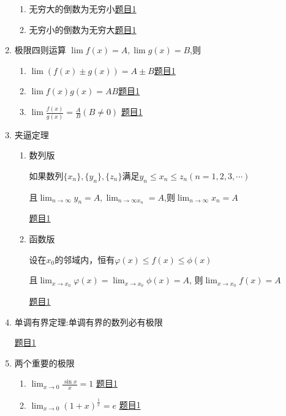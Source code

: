 \documentclass[12pt]{article} %
\begin{document}
\begin{enumerate}
\begin{enumerate}
        \item 无穷大的倒数为无穷小\quad \href{https://www.matongxue.com/matex/2596/react/}{题目1}
        \item 无穷小的倒数为无穷大\quad \href{https://www.matongxue.com/matex/2597/react/}{题目1}
    \end{enumerate}
\item 极限四则运算
    $\lim f(x)=A,\lim g(x)=B$,则
    \begin{enumerate}
        \item $\lim (f(x) \pm g(x))=A \pm B$\quad \href{https://www.matongxue.com/matex/2598/react/}{题目1}
        \item $\lim f(x)g(x)=AB$\quad \href{https://www.matongxue.com/matex/2599/react/}{题目1}
        \item $\displaystyle\lim \frac{f(x)}{g(x)}=\frac{A}{B}(B \neq 0)$
        \quad \href{https://www.matongxue.com/matex/2600/react/}{题目1}
    \end{enumerate}
\item 夹逼定理
    \begin{enumerate}
        \item 数列版
        \par 如果数列$\{x_n\},\{y_n\},\{z_n\}$满足$y_n\leq x_n \leq z_n(n=1,2,3,\cdots)$
        \par 且$\displaystyle\lim_{n\to\infty}y_n=A,\lim_{n\to\infty x_n}=A$,则$\displaystyle\lim_{n\to\infty}x_n=A$
        \par \href{https://www.matongxue.com/matex/2602/react/}{题目1}
        \item 函数版
        \par 设在$x_0$的邻域内，恒有$\varphi(x)\leq f(x) \leq \phi(x)$
        \par 且$\displaystyle\lim_{x\to x_0}\varphi(x)=\lim_{x\to x_0}\phi(x)=A$,
        则$\displaystyle\lim_{x\to x_0}f(x)=A$
        \par \href{https://www.matongxue.com/matex/2601/react/}{题目1}
    \end{enumerate}
\item 单调有界定理:单调有界的数列必有极限
    \par \href{https://www.matongxue.com/matex/2603/react/}{题目1}
\item 两个重要的极限
    \begin{enumerate}
        \item $\displaystyle\lim_{x\to 0}\frac{\sin x}{x}=1$
        \quad \href{https://www.matongxue.com/matex/2604/react/}{题目1}
        \item $\displaystyle\lim_{x\to 0}(1+x)^{\frac{1}{x}}=e$
        \quad \href{https://www.matongxue.com/matex/2605/react/}{题目1}
    \end{enumerate}
\end{enumerate}
\end{document}
